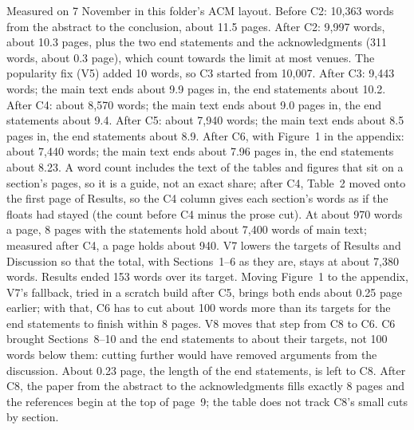 \documentclass[11pt,a4paper]{article}
\begin{document}
Measured on 7 November in this folder's ACM layout. Before C2: 10,363 words from the abstract to
the conclusion, about 11.5 pages. After C2: 9,997 words, about 10.3 pages, plus the two end
statements and the acknowledgments (311 words, about 0.3 page), which count towards the limit at
most venues. The popularity fix (V5) added 10 words, so C3 started from 10,007. After C3: 9,443
words; the main text ends about 9.9 pages in, the end statements about 10.2. After C4: about
8,570 words; the main text ends about 9.0 pages in, the end statements about 9.4. After C5: about
7,940 words; the main text ends about 8.5 pages in, the end statements about 8.9. After C6, with
Figure~1 in the appendix: about 7,440 words; the main text ends about 7.96 pages in, the end
statements about 8.23. A word count includes
the text of the tables and figures that sit on a section's pages, so it is a guide, not an exact
share; after C4, Table~2 moved onto the first page of Results, so the C4 column gives each
section's words as if the floats had stayed (the count before C4 minus the prose cut). At about
970 words a page, 8 pages with the statements hold about 7,400 words of main text; measured after
C4, a page holds about 940. V7 lowers the targets of Results and Discussion so that the
total, with Sections~1--6 as they are, stays at about 7,380 words. Results ended 153 words over
its target. Moving Figure~1 to the appendix, V7's fallback, tried in a scratch build after C5,
brings both ends about 0.25 page earlier; with that, C6 has to cut about 100 words more than its
targets for the end statements to finish within 8 pages. V8 moves that step from C8 to C6. C6
brought Sections~8--10 and the end statements to about their targets, not 100 words below them:
cutting further would have removed arguments from the discussion. About 0.23 page, the length of
the end statements, is left to C8. After C8, the paper from the abstract to the acknowledgments
fills exactly 8 pages and the references begin at the top of page~9; the table does not track C8's
small cuts by section.
\end{document}
